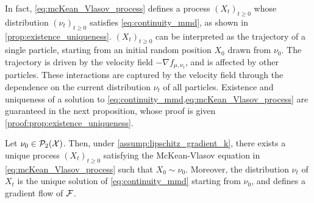 In fact,  \cref{eq:mcKean_Vlasov_process} defines a process $(X_t)_{t\geq 0}$ whose distribution $(\nu_t)_{t\geq 0}$ satisfies \cref{eq:continuity_mmd}, as shown in \cref{prop:existence_uniqueness}. 
$(X_t)_{t\geq 0}$ can be interpreted as the trajectory of a single particle, starting from an initial random position $X_0$ drawn from $\nu_0$. The trajectory is driven by the velocity field $-\nabla f_{\mu,\nu_t}$, and is affected by other particles. These interactions are captured by the velocity field through the dependence on the current distribution $\nu_t$ of all particles.
Existence and uniqueness of a solution to \cref{eq:continuity_mmd,eq:mcKean_Vlasov_process} are guaranteed in the next proposition, whose proof is given \cref{proof:prop:existence_uniqueness}.
\begin{proposition}\label{prop:existence_uniqueness}
	Let $\nu_0\in \mathcal{P}_2({{\mathcal X}})$. %
	Then, under \cref{assump:lipschitz_gradient_k}, there exists a unique process $(X_t)_{t\geq 0}$  satisfying the McKean-Vlasov equation in \cref{eq:mcKean_Vlasov_process} such that $X_0 \sim \nu_0$. Moreover, the distribution $\nu_t$ of $X_t$ is the unique solution of \cref{eq:continuity_mmd} starting from $\nu_0$, and defines a gradient flow of ${{\mathcal F}}$. 
\end{proposition}
